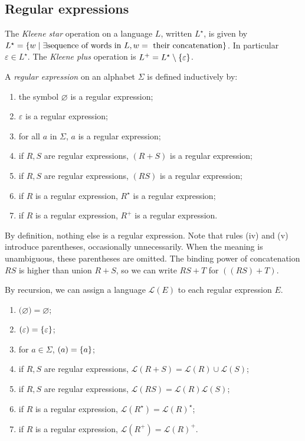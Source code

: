 \subsection{Regular expressions}
\begin{definition}
	The \emph{Kleene star} operation on a language \( L \), written \( L^\star \), is given by \( L^\star = \qty{w \mid \exists \text{sequence of words in } L, w = \text{ their concatenation}} \).
	In particular \( \varepsilon \in L^\star \).
	The \emph{Kleene plus} operation is \( L^+ = L^\star \setminus \qty{\varepsilon} \).
\end{definition}
\begin{definition}
	A \emph{regular expression} on an alphabet \( \Sigma \) is defined inductively by:
	\begin{enumerate}
		\item the symbol \( \varnothing \) is a regular expression;
		\item \( \varepsilon \) is a regular expression;
		\item for all \( a \) in \( \Sigma \), \( a \) is a regular expression;
		\item if \( R, S \) are regular expressions, \( (R + S) \) is a regular expression;
		\item if \( R, S \) are regular expressions, \( (R S) \) is a regular expression;
		\item if \( R \) is a regular expression, \( R^\star \) is a regular expression;
		\item if \( R \) is a regular expression, \( R^+ \) is a regular expression.
	\end{enumerate}
	By definition, nothing else is a regular expression.
	Note that rules (iv) and (v) introduce parentheses, occasionally unnecessarily.
	When the meaning is unambiguous, these parentheses are omitted.
	The binding power of concatenation \( RS \) is higher than union \( R + S \), so we can write \( RS + T \) for \( ((RS) + T) \).

	By recursion, we can assign a language \( \mathcal L(E) \) to each regular expression \( E \).
	\begin{enumerate}
		\item \( \mathcal (\varnothing) = \varnothing \);
		\item \( \mathcal (\varepsilon) = \qty{\varepsilon} \);
		\item for \( a \in \Sigma \), \( \mathcal (a) = \qty{a} \);
		\item if \( R, S \) are regular expressions, \( \mathcal L(R + S) = \mathcal L(R) \cup \mathcal L(S) \);
		\item if \( R, S \) are regular expressions, \( \mathcal L(R S) = \mathcal L(R) \mathcal L(S) \);
		\item if \( R \) is a regular expression, \( \mathcal L(R^\star) = \mathcal L(R)^\star \);
		\item if \( R \) is a regular expression, \( \mathcal L(R^+) = \mathcal L(R)^+ \).
	\end{enumerate}
\end{definition}
